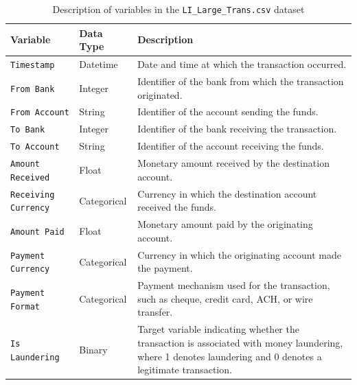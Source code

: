 \begin{table}[H]
\centering
\caption{Description of variables in the \texttt{LI\_Large\_Trans.csv} dataset}
\label{tab:li_large_columns}
\renewcommand{\arraystretch}{1.15}
    \begin{tabular}{p{3.0cm} p{2.2cm} p{8.2cm}}
    \toprule
    \textbf{Variable} & \textbf{Data Type} & \textbf{Description} \\
    \midrule
    
    \texttt{Timestamp}
    & Datetime
    & Date and time at which the transaction occurred. \\
    \midrule
    
    \texttt{From Bank}
    & Integer
    & Identifier of the bank from which the transaction originated. \\
    \midrule
    
    \texttt{From Account}
    & String
    & Identifier of the account sending the funds. \\
    \midrule
    
    \texttt{To Bank}
    & Integer
    & Identifier of the bank receiving the transaction. \\
    \midrule
    
    \texttt{To Account}
    & String
    & Identifier of the account receiving the funds. \\
    \midrule
    
    \texttt{Amount Received}
    & Float
    & Monetary amount received by the destination account. \\
    \midrule
    
    \texttt{Receiving Currency}
    & Categorical
    & Currency in which the destination account received the funds. \\
    \midrule
    
    \texttt{Amount Paid}
    & Float
    & Monetary amount paid by the originating account. \\
    \midrule
    
    \texttt{Payment Currency}
    & Categorical
    & Currency in which the originating account made the payment. \\
    \midrule
    
    \texttt{Payment Format}
    & Categorical
    & Payment mechanism used for the transaction, such as cheque, credit card, ACH, or wire transfer. \\
    \midrule
    
    \texttt{Is Laundering}
    & Binary
    & Target variable indicating whether the transaction is associated with money laundering, where 1 denotes laundering and 0 denotes a legitimate transaction. \\
    
    \bottomrule
    \end{tabular}
\end{table}

